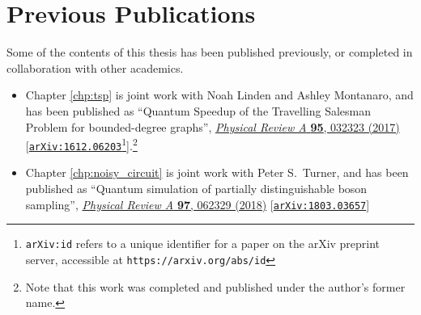 \chapter*{Previous Publications}

Some of the contents of this thesis has been published previously, or completed in collaboration with other academics.

\begin{itemize}
\item Chapter \ref{chp:tsp} is joint work with Noah Linden and Ashley Montanaro, and has been published as ``Quantum Speedup of the Travelling Salesman Problem for bounded-degree graphs'', \href{https://link.aps.org/doi/10.1103/PhysRevA.95.032323}{\textit{Physical Review A} \textbf{95}, 032323 (2017)} [{\tt \href{https://arxiv.org/abs/1612.06203}{arXiv:1612.06203}}\footnote{{\tt arXiv:id} refers to a unique identifier for a paper on the arXiv preprint server, accessible at {\tt https://arxiv.org/abs/id}}].\footnote{Note that this work was completed and published under the author's former name.}
\item Chapter \ref{chp:noisy_circuit} is joint work with Peter S.\ Turner, and has been published as ``Quantum simulation of partially distinguishable boson sampling'', \href{https://link.aps.org/doi/10.1103/PhysRevA.97.062329}{\textit{Physical Review A} \textbf{97}, 062329 (2018)} [{\tt \href{https://arxiv.org/abs/1803.03657}{arXiv:1803.03657}}]
\end{itemize}